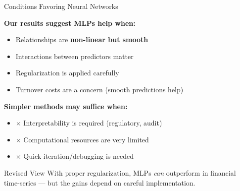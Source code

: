 \documentclass[10pt]{beamer}
\newcommand{\highlight}[1]{\textcolor{AccentOrange}{\textbf{#1}}}
\begin{document}
\begin{frame}{Conditions Favoring Neural Networks}

  \textbf{Our results suggest MLPs help when:}
  \begin{itemize}
    \item \textcolor{AccentGreen}{\checkmark} Relationships are \highlight{non-linear but smooth}
    \item \textcolor{AccentGreen}{\checkmark} Interactions between predictors matter
    \item \textcolor{AccentGreen}{\checkmark} Regularization is applied carefully
    \item \textcolor{AccentGreen}{\checkmark} Turnover costs are a concern (smooth predictions help)
  \end{itemize}

  \vspace{1em}
  \textbf{Simpler methods may suffice when:}
  \begin{itemize}
    \item \textcolor{AccentOrange}{$\times$} Interpretability is required (regulatory, audit)
    \item \textcolor{AccentOrange}{$\times$} Computational resources are very limited
    \item \textcolor{AccentOrange}{$\times$} Quick iteration/debugging is needed
  \end{itemize}

  \vspace{0.5em}
  \begin{block}{Revised View}
    With proper regularization, MLPs \textit{can} outperform in financial time-series --- but the gains depend on careful implementation.
  \end{block}
\end{frame}

\end{document}
